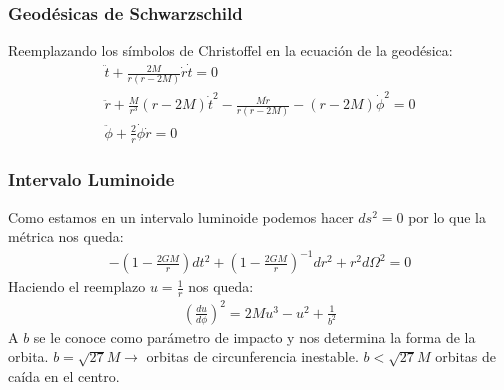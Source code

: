 \documentclass{beamer}
\begin{document}


\begin{frame}
\frametitle{Geodésicas de Schwarzschild}

Reemplazando los símbolos de Christoffel en la ecuación de la geodésica: 
\begin{gather*}
  \ddot t + \frac{2M}{r(r-2M)}\dot r \dot t = 0\\
  \ddot r + \frac{M}{r^3}(r-2M)\dot t^2 - \frac{M\dot r}{r(r-2M)}-(r-2M)\dot \phi^2=0 \\
  \ddot \phi + \frac{2}{r} \dot \phi \dot r = 0 
\end{gather*}
\end{frame}




\begin{frame}
\frametitle{Intervalo Luminoide}
Como estamos en un intervalo luminoide podemos hacer $ ds^2 = 0  $ por lo que la métrica nos queda: 
\begin{gather*}
  - \left(1 - \frac{2GM }{r }\right)dt^2 + \left(1 - \frac{2GM }{r}\right) ^ {-1 } dr^2 + r^2 d \Omega^2 = 0 
\end{gather*}
Haciendo el reemplazo $ u = \frac{1}{r} $ nos queda: 
\begin{gather*}
  \left(\frac{d u  }{d \phi }\right)^2 = 2M u^3 - u^2 + \frac{1}{b^2 } 
\end{gather*}
A $ b  $ se le conoce como parámetro de impacto y nos determina la forma de la orbita. $ b = \sqrt{27 } M  \rightarrow $ orbitas de circunferencia inestable. $ b < \sqrt{27 } M  $ orbitas de caída en el centro.
\end{frame}
\end{document}
